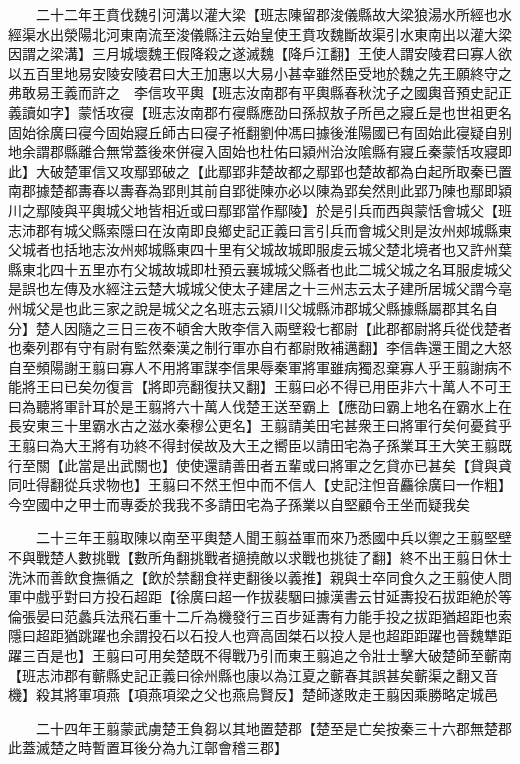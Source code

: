 　　二十二年王賁伐魏引河溝以灌大梁【班志陳留郡浚儀縣故大梁狼湯水所經也水經渠水出滎陽北河東南流至浚儀縣注云始皇使王賁攻魏斷故渠引水東南出以灌大梁因謂之梁溝】三月城壞魏王假降殺之遂滅魏【降戶江翻】王使人謂安陵君曰寡人欲以五百里地易安陵安陵君曰大王加惠以大易小甚幸雖然臣受地於魏之先王願終守之弗敢易王義而許之　李信攻平輿【班志汝南郡有平輿縣春秋沈子之國輿音預史記正義讀如字】蒙恬攻寑【班志汝南郡冇寑縣應劭曰孫叔敖子所邑之寢丘是也世祖更名固始徐廣曰寑今固始寢丘師古曰寑子袵翻劉仲馮曰據後淮陽國已有固始此寑疑自别地余謂郡縣離合無常蓋後來併寑入固始也杜佑曰潁州治汝隂縣有寢丘秦蒙恬攻寢即此】大破楚軍信又攻鄢郢破之【此鄢郢非楚故都之鄢郢也楚故都為白起所取秦已置南郡據楚都夀春以夀春為郢則其前自郢徙陳亦必以陳為郢矣然則此郢乃陳也鄢即潁川之鄢陵與平輿城父地皆相近或曰鄢郢當作鄢陵】於是引兵而西與蒙恬會城父【班志沛郡有城父縣索隱曰在汝南即良鄉史記正義曰言引兵而會城父則是汝州郟城縣東父城者也括地志汝州郟城縣東四十里有父城故城即服䖍云城父楚北境者也又許州葉縣東北四十五里亦冇父城故城即杜預云襄城城父縣者也此二城父城之名耳服䖍城父是誤也左傳及水經注云楚大城城父使太子建居之十三州志云太子建所居城父謂今亳州城父是也此三家之說是城父之名班志云潁川父城縣沛郡城父縣據縣屬郡其名自分】楚人因隨之三日三夜不頓舍大敗李信入兩壁殺七都尉【此郡都尉將兵從伐楚者也秦列郡有守有尉有監然秦漢之制行軍亦自冇都尉敗補邁翻】李信犇還王聞之大怒自至頻陽謝王翦曰寡人不用將軍謀李信果辱秦軍將軍雖病獨忍棄寡人乎王翦謝病不能將王曰已矣勿復言【將即亮翻復扶又翻】王翦曰必不得已用臣非六十萬人不可王曰為聽將軍計耳於是王翦將六十萬人伐楚王送至霸上【應劭曰霸上地名在霸水上在長安東三十里霸水古之滋水秦穆公更名】王翦請美田宅甚衆王曰將軍行矣何憂貧乎王翦曰為大王將有功終不得封侯故及大王之嚮臣以請田宅為子孫業耳王大笑王翦既行至關【此當是出武關也】使使還請善田者五輩或曰將軍之乞貸亦已甚矣【貸與貣同吐得翻從兵求物也】王翦曰不然王怛中而不信人【史記注怛音麤徐廣曰一作粗】今空國中之甲士而專委於我我不多請田宅為子孫業以自堅顧令王坐而疑我矣

　　二十三年王翦取陳以南至平輿楚人聞王翦益軍而來乃悉國中兵以禦之王翦堅壁不與戰楚人數挑戰【數所角翻挑戰者擿撓敵以求戰也挑徒了翻】終不出王翦日休士洗沐而善飲食撫循之【飲於禁翻食祥吏翻後以義推】親與士卒同食久之王翦使人問軍中戲乎對曰方投石超距【徐廣曰超一作拔裴駰曰據漢書云甘延夀投石拔距絶於等倫張晏曰范蠡兵法飛石重十二斤為機發行三百步延夀有力能手投之拔距猶超距也索隱曰超距猶跳躍也余謂投石以石投人也齊高固桀石以投人是也超距距躍也晉魏犨距躍三百是也】王翦曰可用矣楚既不得戰乃引而東王翦追之令壯士擊大破楚師至蘄南【班志沛郡有蘄縣史記正義曰徐州縣也康以為江夏之蘄春其誤甚矣蘄渠之翻又音機】殺其將軍項燕【項燕項梁之父也燕烏賢反】楚師遂敗走王翦因乘勝略定城邑

　　二十四年王翦蒙武虜楚王負芻以其地置楚郡【楚至是亡矣按秦三十六郡無楚郡此蓋滅楚之時暫置耳後分為九江鄣會稽三郡】


